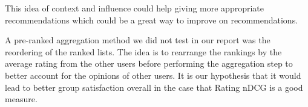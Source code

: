 This idea of context and influence could help giving more appropriate recommendations which could be a great way to improve on recommendations.

A pre-ranked aggregation method we did not test in our report was the reordering of the ranked lists.
The idea is to rearrange the rankings by the average rating from the other users before performing the aggregation step to better account for the opinions of other users. It is our hypothesis that it would lead to better group satisfaction overall in the case that Rating nDCG is a good measure.